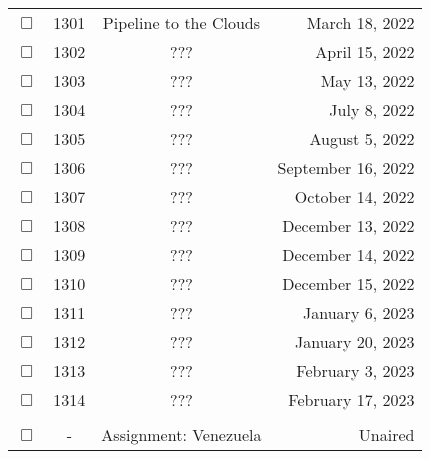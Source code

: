 \documentclass[12pt]{article}
\begin{document}
\begin{center}
\begin{longtable}[c]{cccr}
$\Box$&1301&Pipeline to the Clouds&March 18, 2022\\
$\Box$&1302&???&April 15, 2022\\
$\Box$&1303&???&May 13, 2022\\
$\Box$&1304&???&July 8, 2022\\
$\Box$&1305&???&August 5, 2022\\
$\Box$&1306&???&September 16, 2022\\
$\Box$&1307&???&October 14, 2022\\
$\Box$&1308&???&December 13, 2022\\
$\Box$&1309&???&December 14, 2022\\
$\Box$&1310&???&December 15, 2022\\
$\Box$&1311&???&January 6, 2023\\
$\Box$&1312&???&January 20, 2023\\
$\Box$&1313&???&February 3, 2023\\
$\Box$&1314&???&February 17, 2023\\

\\  %
$\Box$&-&Assignment: Venezuela&Unaired\\
\end{longtable}\end{center}
\end{document}
